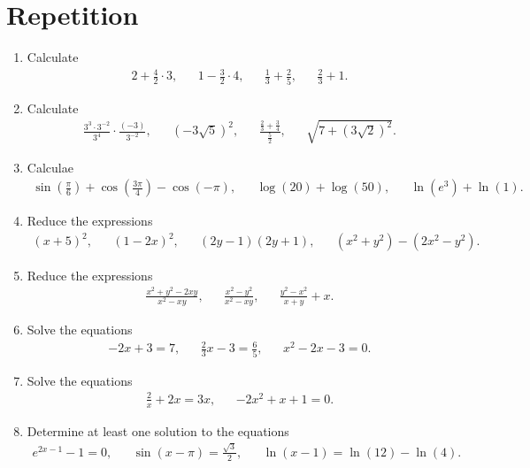 \section{Repetition}
\begin{enumerate}
	\item Calculate
	\begin{align*}
	2+\frac{4}{2}\cdot 3,&& 1-\frac{3}{2}\cdot 4,&& \frac{1}{3}+\frac{2}{5},&& \frac{2}{3}+1.
	\end{align*}
	
	\item Calculate
	\begin{align*}
	\frac{3^3\cdot 3^{-2}}{3^4}\cdot \frac{(-3)}{3^{-2}},&& (-3\sqrt{5})^2,&&\frac{\frac{2}{3}+\frac{3}{4}}{\frac{5}{2}},&& \sqrt{7+(3\sqrt{2})^2}.
	\end{align*}
	
	\item Calculae
	\begin{align*}
	\sin(\frac{\pi}{6})+\cos(\frac{3\pi}{4})-\cos(-\pi),&& \log(20)+\log(50),&& \ln(e^3)+\ln(1).
	\end{align*}
	
	\item Reduce the expressions
	\begin{align*}
	(x+5)^2,&& (1-2x)^2,&& (2y-1)(2y+1),&& (x^2+y^2)-(2x^2-y^2).
	\end{align*}
	
	\item Reduce the expressions
	\begin{align*}
	\frac{x^2+y^2-2xy}{x^2-xy},&& \frac{x^2-y^2}{x^2-xy},&& \frac{y^2-x^2}{x+y}+x.
	\end{align*}
	
	\item Solve the equations
	\begin{align*}
	-2x+3=7,&& \frac{2}{3}x-3=\frac{6}{5},&&x^2-2x-3=0.
	\end{align*}
	
	\item Solve the equations
	\begin{align*}
	\frac{2}{x}+2x=3x,&& -2x^2+x+1=0.
	\end{align*}
	
	\item Determine at least one solution to the equations 
	\begin{align*}
	e^{2x-1}-1=0,&& \sin(x-\pi)=\frac{\sqrt{3}}{2},&& \ln(x-1)=\ln(12)-\ln(4).
	\end{align*}
	

\end{enumerate}
